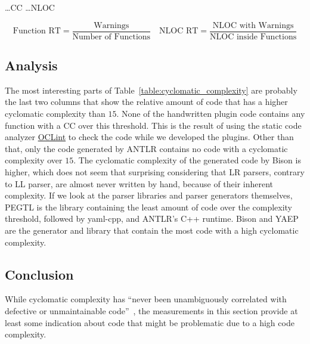 \begin{table}[H]
\begin{adjustbox}{max width=\textwidth}
\begin{threeparttable}
  \vspace{0.2cm}
  \begin{tablenotes}
    \item
        \hspace{1.65cm}
        …\glsdesc{CC}
        \hspace{1.7cm}
        …\glsdesc{NLOC}
    \item
      \[
       \text{Function RT} = \frac{\text{Warnings}}{\text{Number of Functions}}\quad
       \text{NLOC RT} = \frac{\text{NLOC with Warnings}}{\text{NLOC inside Functions}}
      \]
  \end{tablenotes}

  \end{threeparttable}
  \end{adjustbox}
\end{table}

\subsection{Analysis}

The most interesting parts of Table~\ref{table:cyclomatic_complexity} are probably the last two columns that show the relative amount of code that has a higher cyclomatic complexity than $15$. None of the handwritten plugin code contains any function with a \gls{CC} over this threshold. This is the result of using the static code analyzer \href{http://oclint.org}{OCLint} to check the code while we developed the plugins. Other than that, only the code generated by \gls{ANTLR} contains no code with a cyclomatic complexity over $15$. The cyclomatic complexity of the generated code by Bison is higher, which does not seem that surprising considering that LR parsers, contrary to LL parser, are almost never written by hand, because of their inherent complexity. If we look at the parser libraries and parser generators themselves, \gls{PEGTL} is the library containing the least amount of code over the complexity threshold, followed by yaml-cpp, and ANTLR’s C++ runtime. Bison and \gls{YAEP} are the generator and library that contain the most code with a high cyclomatic complexity.

\subsection{Conclusion}

While cyclomatic complexity has “never been unambiguously correlated with defective or unmaintainable code”~\cite{martin2017c++}, the measurements in this section provide at least some indication about code that might be problematic due to a high code complexity.

